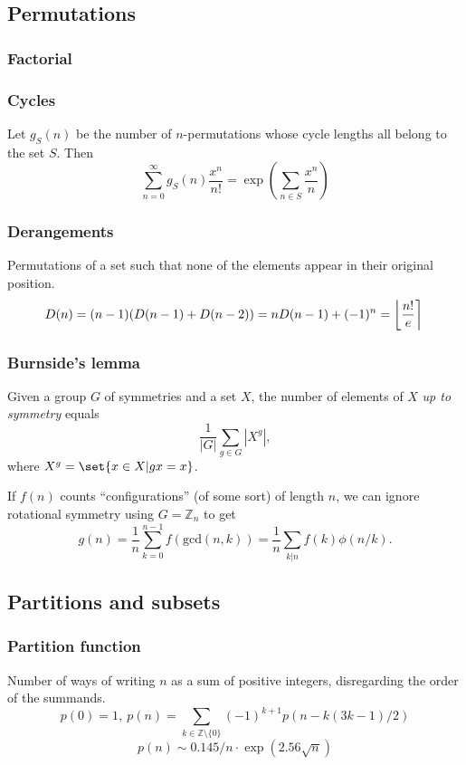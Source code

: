 \subsection{Permutations}
	\subsubsection{Factorial}
		


	\subsubsection{Cycles}
		Let $g_S(n)$ be the number of $n$-permutations whose cycle lengths all belong to the set $S$. Then
		$$\sum_{n=0} ^\infty g_S(n) \frac{x^n}{n!} = \exp\left(\sum_{n\in S} \frac{x^n} {n} \right)$$

	\subsubsection{Derangements}
		Permutations of a set such that none of the elements appear in their original position.
		\[ \mkern-2mu D(n) = (n-1)(D(n-1)+D(n-2)) = n D(n-1)+(-1)^n = \left\lfloor\frac{n!}{e}\right\rceil \]

	\subsubsection{Burnside's lemma}
		Given a group $G$ of symmetries and a set $X$, the number of elements of $X$ \emph{up to symmetry} equals
		 \[ {\frac {1}{|G|}}\sum _{{g\in G}}|X^{g}|, \]
		 where $X^{g} = \set{ x \in X | gx = x}$.

		 If $f(n)$ counts ``configurations'' (of some sort) of length $n$, we can ignore rotational symmetry using $G = \mathbb Z_n$ to get
		 \[ g(n) = \frac 1 n \sum_{k=0}^{n-1}{f(\text{gcd}(n, k))} = \frac 1 n \sum_{k|n}{f(k)\phi(n/k)}. \]

\subsection{Partitions and subsets}
	\subsubsection{Partition function}
		Number of ways of writing $n$ as a sum of positive integers, disregarding the order of the summands.
		\[ p(0) = 1,\ p(n) = \sum_{k \in \mathbb Z \setminus \{0\}}{(-1)^{k+1} p(n - k(3k-1) / 2)} \]
		\[ p(n) \sim 0.145 / n \cdot \exp(2.56 \sqrt{n}) \]

